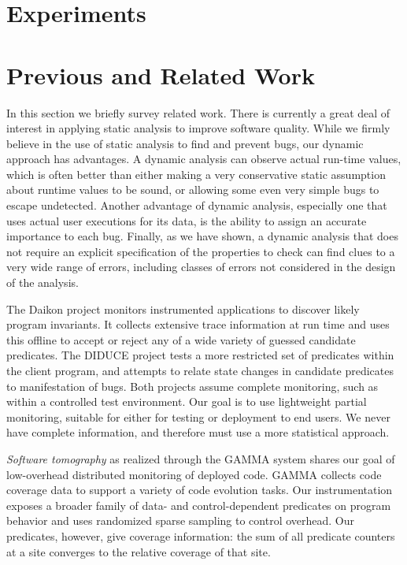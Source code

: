 \documentclass[draft]{sig-alternate}
\newcommand{\termdef}[1]{\textit{#1}}
\begin{document}
\section{Experiments}
\label{sec:experiments}




\section{Previous and Related Work}
\label{sec:related-work}

In this section we briefly survey related work. There is currently a
great deal of interest in applying static analysis to improve software
quality.  While we firmly believe in the use of static analysis to
find and prevent bugs, our dynamic approach has advantages. A dynamic
analysis can observe actual run-time values, which is often better
than either making a very conservative static assumption about runtime
values to be sound, or allowing some even very simple bugs to escape
undetected.  Another advantage of dynamic analysis, especially one
that uses actual user executions for its data, is the ability to
assign an accurate importance to each bug.  Finally, as we have shown,
a dynamic analysis that does not require an explicit specification of
the properties to check can find clues to a very wide range of errors,
including classes of errors not considered in the design of the
analysis.
  
The Daikon project \cite{ernst2001} monitors instrumented applications
to discover likely program invariants.  It collects extensive trace
information at run time and uses this offline to accept or reject any
of a wide variety of guessed candidate predicates.  The DIDUCE project
\cite{ICSE02*291} tests a more restricted set of predicates within the
client program, and attempts to relate state changes in candidate
predicates to manifestation of bugs.  Both projects assume complete
monitoring, such as within a controlled test environment.  Our goal is
to use lightweight partial monitoring, suitable for either for testing
or deployment to end users.  We never have complete information, and
therefore must use a more statistical approach.

\termdef{Software tomography} as realized through the GAMMA system
\cite{PASTE'02*2,Orso:2003:LFDIART} shares our goal of low-overhead
distributed monitoring of deployed code.  GAMMA collects code coverage
data to support a variety of code evolution tasks.  Our
instrumentation exposes a broader family of data- and
control-dependent predicates on program behavior and uses randomized
sparse sampling to control overhead.  Our
predicates, however, give coverage information: the sum of all predicate counters at a site converges to the relative coverage of that site.
\end{document}
